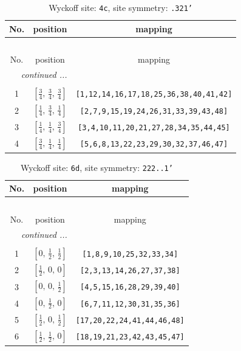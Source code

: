 \documentclass[fleqn,8pt]{jsarticle}
\begin{document}
\renewcommand{\arraystretch}{1.2}
\begin{longtable}{ccc}
\caption{Wyckoff site: {\tt 4c}, site symmetry: {\tt .321'}}
 \\
 \hline \hline
No. & position & mapping \\ \hline \endfirsthead

\multicolumn{2}{l}{\tablename\ \thetable{}} \\
 \hline \hline
No. & position & mapping \\ \hline \endhead

 \hline \hline
\multicolumn{2}{r}{\footnotesize\it continued ...} \\ \endfoot

 \hline \hline
\multicolumn{2}{r}{} \\ \endlastfoot

1 & $\left[ \frac{3}{4},\, \frac{3}{4},\, \frac{3}{4} \right]$ & {\tt [1,12,14,16,17,18,25,36,38,40,41,42]} \\ \hline
2 & $\left[ \frac{1}{4},\, \frac{3}{4},\, \frac{1}{4} \right]$ & {\tt [2,7,9,15,19,24,26,31,33,39,43,48]} \\ \hline
3 & $\left[ \frac{1}{4},\, \frac{1}{4},\, \frac{3}{4} \right]$ & {\tt [3,4,10,11,20,21,27,28,34,35,44,45]} \\ \hline
4 & $\left[ \frac{3}{4},\, \frac{1}{4},\, \frac{1}{4} \right]$ & {\tt [5,6,8,13,22,23,29,30,32,37,46,47]} \\
\end{longtable}
\renewcommand{\arraystretch}{1.2}
\begin{longtable}{ccc}
\caption{Wyckoff site: {\tt 6d}, site symmetry: {\tt 222..1'}}
 \\
 \hline \hline
No. & position & mapping \\ \hline \endfirsthead

\multicolumn{2}{l}{\tablename\ \thetable{}} \\
 \hline \hline
No. & position & mapping \\ \hline \endhead

 \hline \hline
\multicolumn{2}{r}{\footnotesize\it continued ...} \\ \endfoot

 \hline \hline
\multicolumn{2}{r}{} \\ \endlastfoot

1 & $\left[ 0,\, \frac{1}{2},\, \frac{1}{2} \right]$ & {\tt [1,8,9,10,25,32,33,34]} \\ \hline
2 & $\left[ \frac{1}{2},\, 0,\, 0 \right]$ & {\tt [2,3,13,14,26,27,37,38]} \\ \hline
3 & $\left[ 0,\, 0,\, \frac{1}{2} \right]$ & {\tt [4,5,15,16,28,29,39,40]} \\ \hline
4 & $\left[ 0,\, \frac{1}{2},\, 0 \right]$ & {\tt [6,7,11,12,30,31,35,36]} \\ \hline
5 & $\left[ \frac{1}{2},\, 0,\, \frac{1}{2} \right]$ & {\tt [17,20,22,24,41,44,46,48]} \\ \hline
6 & $\left[ \frac{1}{2},\, \frac{1}{2},\, 0 \right]$ & {\tt [18,19,21,23,42,43,45,47]} \\
\end{longtable}
\end{document}
